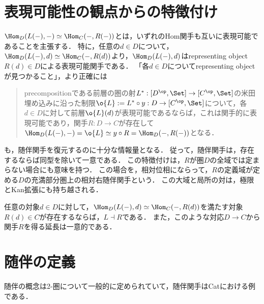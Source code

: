 \documentclass[uplatex,dvipdfmx]{jsreport}
\begin{document}
\begin{proposition}[普遍射の族は随伴関手を定める]
    
\end{proposition}

\section{表現可能性の観点からの特徴付け}

\begin{tcolorbox}[colframe=ForestGreen, colback=ForestGreen!10!white, breakable ,colbacktitle=ForestGreen!40!white, coltitle=black,fonttitle=\bfseries\sffamily,
    title=adjoint functor]
    $\Hom_D(L(-),-)\simeq\Hom_C(-,R(-))$とは，いずれのHom関手も互いに表現可能であることを主張する．
    特に，任意の$d\in D$について，$\Hom_D(L(-),d)\simeq\Hom_C(-,R(d))$より，$\Hom_D(L(-),d)$はrepresenting object $R(d)\in D$による表現可能関手である．
    「各$d\in D$についてrepresenting objectが見つかること」，より正確には
    \begin{quotation}
        precompositionである前層の圏の射$L^*:[D^\op,\Set]\to[C^\op,\Set]$の米田埋め込みに沿った制限$\o{L}:=L^*\circ y:D\to[C^\op,\Set]$について，各$d\in D$に対して前層$\o{L}(d)$が表現可能であるならば，これは関手的に表現可能であり，関手$R:D\to C$が存在して$\Hom_D(L(-),-)=\o{L}\simeq y\circ R=\Hom_D(-,R(-))$となる．
    \end{quotation}
    も，随伴関手を復元するのに十分な情報量となる．
    従って，随伴関手は，存在するならば同型を除いて一意である．
    この特徴付けは，$R$が圏$D$の全域では定まらない場合にも意味を持つ．
    この場合を，相対位相にならって，$R$の定義域が定める$D$の充満部分圏上の相対右随伴関手という．
    この大域と局所の対は，極限とKan拡張にも持ち越される．
\end{tcolorbox}

\begin{proposition}
    任意の対象$d\in D$に対して，$\Hom_D(L(-),d)\simeq\Hom_C(-,R(d))$を満たす対象$R(d)\in C$が存在するならば，$L\dashv R$である．
    また，このような対応$D\to C$から関手$R$を得る延長は一意的である．
\end{proposition}

\section{随伴の定義}

\begin{tcolorbox}[colframe=ForestGreen, colback=ForestGreen!10!white, breakable ,colbacktitle=ForestGreen!40!white, coltitle=black,fonttitle=\bfseries\sffamily,
    title=adjunction]
    随伴の概念は2-圏について一般的に定められていて，随伴関手はCatにおける例である．
\end{tcolorbox}
\end{document}

